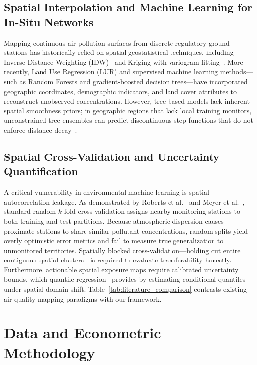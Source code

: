 \documentclass[conference]{IEEEtran}
\begin{document}
\subsection{Spatial Interpolation and Machine Learning for In-Situ Networks}
Mapping continuous air pollution surfaces from discrete regulatory ground stations has historically relied on spatial geostatistical techniques, including Inverse Distance Weighting (IDW)~\cite{shepard1968} and Kriging with variogram fitting~\cite{cressie2011}. More recently, Land Use Regression (LUR) and supervised machine learning methods---such as Random Forests and gradient-boosted decision trees---have incorporated geographic coordinates, demographic indicators, and land cover attributes to reconstruct unobserved concentrations. However, tree-based models lack inherent spatial smoothness priors; in geographic regions that lack local training monitors, unconstrained tree ensembles can predict discontinuous step functions that do not enforce distance decay~\cite{meyer2018,cressie2011}.

\subsection{Spatial Cross-Validation and Uncertainty Quantification}
A critical vulnerability in environmental machine learning is spatial autocorrelation leakage. As demonstrated by Roberts et al.~\cite{roberts2017} and Meyer et al.~\cite{meyer2018}, standard random $k$-fold cross-validation assigns nearby monitoring stations to both training and test partitions. Because atmospheric dispersion causes proximate stations to share similar pollutant concentrations, random splits yield overly optimistic error metrics and fail to measure true generalization to unmonitored territories. Spatially blocked cross-validation---holding out entire contiguous spatial clusters---is required to evaluate transferability honestly. Furthermore, actionable spatial exposure maps require calibrated uncertainty bounds, which quantile regression~\cite{koenker2001} provides by estimating conditional quantiles under spatial domain shift. Table~\ref{tab:literature_comparison} contrasts existing air quality mapping paradigms with our framework.



\section{Data and Econometric Methodology}
\label{sec:data}
\end{document}
